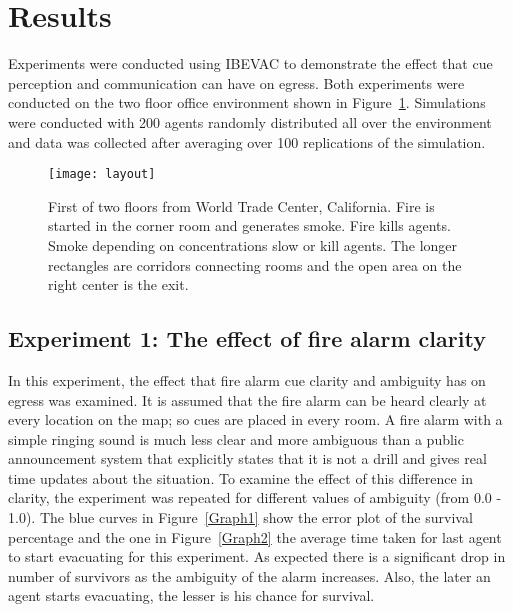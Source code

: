 \section{Results}
\label{Results}

Experiments were conducted using IBEVAC to demonstrate the effect that cue perception and communication can have on egress. Both experiments were conducted on the two floor office environment shown in Figure~\ref{fig:layout}. Simulations were conducted with 200 agents randomly distributed all over the environment and data was collected after averaging over 100 replications of the simulation.

\begin{figure}[!tb]
\centering
\texttt{[image: layout]}
\caption[The Environment Layout]{First of two floors from World Trade Center, California. Fire is started in the corner room and generates smoke. Fire kills agents. Smoke depending on concentrations slow or kill agents. The longer rectangles are corridors connecting rooms and the open area on the right center is the exit.}
\label{fig:layout}
\end{figure}


\subsection{Experiment 1: The effect of fire alarm clarity}
\label{experiment1}

In this experiment, the effect that fire alarm cue clarity and ambiguity has on egress was examined. It is assumed that the fire alarm can be heard clearly at every location on the map; so cues are placed in every room. A fire alarm with a simple ringing sound is much less clear and more ambiguous than a public announcement system that explicitly states that it is not a drill and gives real time updates about the situation. To examine the effect of this difference in clarity, the experiment was repeated for different values of ambiguity (from 0.0 - 1.0). The blue curves in Figure~\ref{Graph1} show the error plot of the survival percentage and the one in Figure~\ref{Graph2} the average time taken for last agent to start evacuating for this experiment. As expected there is a significant drop in number of survivors as the ambiguity of the alarm increases. Also, the later an agent starts evacuating, the lesser is his chance for survival.



